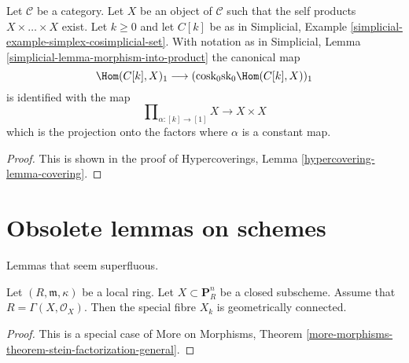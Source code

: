 \begin{lemma}
\label{lemma-cosk0-hom-deltak}
Let $\mathcal{C}$ be a category. Let $X$ be an object of $\mathcal{C}$
such that the self products $X \times \ldots \times X$ exist.
Let $k \geq 0$ and let $C[k]$ be as in
Simplicial, Example \ref{simplicial-example-simplex-cosimplicial-set}.
With notation as in
Simplicial, Lemma \ref{simplicial-lemma-morphism-into-product}
the canonical map
$$
\Hom(C[k], X)_1
\longrightarrow
(\text{cosk}_0 \text{sk}_0 \Hom(C[k], X))_1
$$
is identified with the map
$$
\prod\nolimits_{\alpha : [k] \to [1]} X
\longrightarrow
X \times X
$$
which is the projection onto the factors where $\alpha$
is a constant map.
\end{lemma}

\begin{proof}
This is shown in the proof of
Hypercoverings, Lemma \ref{hypercovering-lemma-covering}.
\end{proof}




\section{Obsolete lemmas on schemes}
\label{section-devissage}

\noindent
Lemmas that seem superfluous.

\begin{lemma}
\label{lemma-stein-projective}
Let $(R, \mathfrak m, \kappa)$ be a local ring.
Let $X \subset \mathbf{P}^n_R$ be a closed subscheme.
Assume that $R = \Gamma(X, \mathcal{O}_X)$. Then the special fibre
$X_k$ is geometrically connected.
\end{lemma}

\begin{proof}
This is a special case of
More on Morphisms, Theorem
\ref{more-morphisms-theorem-stein-factorization-general}.
\end{proof}


